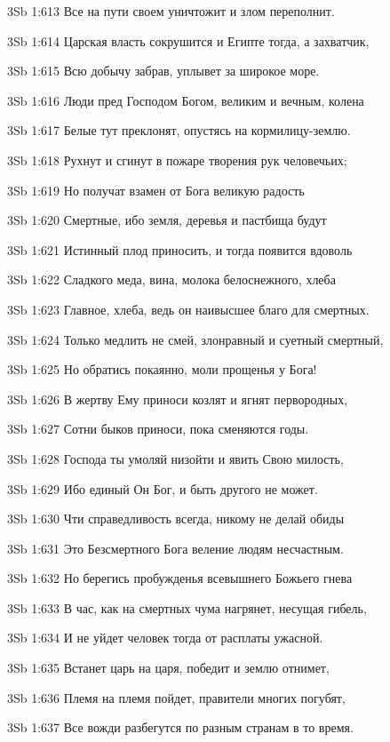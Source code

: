 \vs 3Sb 1:613 Все на пути своем уничтожит и злом переполнит. 

\vs 3Sb 1:614 Царская власть сокрушится и Египте тогда, а захватчик,

\vs 3Sb 1:615 Всю добычу забрав, уплывет за широкое море.

\vs 3Sb 1:616 Люди пред Господом Богом, великим и вечным, колена 

\vs 3Sb 1:617 Белые тут преклонят, опустясь на кормилицу-землю. 

\vs 3Sb 1:618 Рухнут и сгинут в пожаре творения рук человечьих; 

\vs 3Sb 1:619 Но получат взамен от Бога великую радость

\vs 3Sb 1:620 Смертные, ибо земля, деревья и пастбища будут

\vs 3Sb 1:621 Истинный плод приносить, и тогда появится вдоволь 

\vs 3Sb 1:622 Сладкого меда, вина, молока белоснежного, хлеба  

\vs 3Sb 1:623 Главное, хлеба, ведь он  наивысшее благо для смертных.

\vs 3Sb 1:624 Только медлить не смей, злонравный и суетный смертный,

\vs 3Sb 1:625 Но обратись покаянно, моли прощенья у Бога! 

\vs 3Sb 1:626 В жертву Ему приноси козлят и ягнят первородных, 

\vs 3Sb 1:627 Сотни быков приноси, пока сменяются годы. 

\vs 3Sb 1:628 Господа ты умоляй низойти и явить Свою милость, 

\vs 3Sb 1:629 Ибо единый Он Бог, и быть другого не может.

\vs 3Sb 1:630 Чти справедливость всегда, никому не делай обиды  

\vs 3Sb 1:631 Это  Безсмертного Бога веление людям несчастным. 

\vs 3Sb 1:632 Но берегись пробужденья всевышнего Божьего гнева 

\vs 3Sb 1:633 В час, как на смертных чума нагрянет, несущая гибель, 

\vs 3Sb 1:634 И не уйдет человек тогда от расплаты ужасной.

\vs 3Sb 1:635 Встанет царь на царя, победит и землю отнимет, 

\vs 3Sb 1:636 Племя на племя пойдет, правители многих погубят, 

\vs 3Sb 1:637 Все вожди разбегутся по разным странам в то время. 

